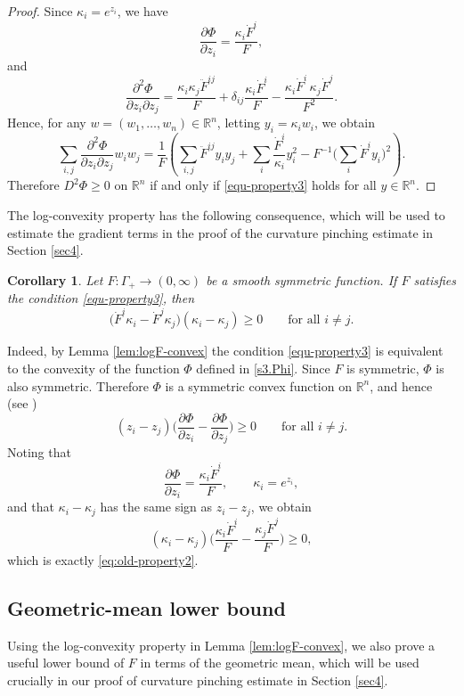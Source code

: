 \documentclass[11pt,reqno]{amsart}
\newtheorem{corollary}[proposition]{Corollary}
\theoremstyle{remark}
\numberwithin{equation}{section}
\begin{document}
\begin{proof}
Since $\kappa_i=e^{z_i}$, we have
\[\frac{\partial\Phi}{\partial z_i}
=\frac{\kappa_i\dot{F}^i}{F}, \]
and
\[\frac{\partial^2\Phi}{\partial z_i\partial z_j}
=\frac{\kappa_i\kappa_j\ddot{F}^{ij}}{F}
+\delta_{ij}\frac{\kappa_i\dot{F}^i}{F}
-\frac{\kappa_i\dot{F}^i\,\kappa_j\dot{F}^j}{F^2}.
\]
Hence, for any $w=(w_1,\dots,w_n)\in\mathbb{R}^n$, letting $y_i=\kappa_i w_i$, we obtain
\[\sum_{i,j}\frac{\partial^2\Phi}{\partial z_i\partial z_j}w_iw_j
=\frac{1}{F}\left(\sum_{i,j}\ddot{F}^{ij}y_iy_j
+\sum_i \frac{\dot{F}^i}{\kappa_i}y_i^2
-F^{-1}\Big(\sum_i \dot{F}^i y_i\Big)^2\right).
\]
Therefore $D^2\Phi\ge 0$ on $\mathbb{R}^n$ if and only if \eqref{equ-property3} holds for all $y\in\mathbb{R}^n$.
\end{proof}

The log-convexity property has the following consequence, which will be used to estimate the gradient terms in the proof of the curvature pinching estimate in Section \ref{sec4}.

\begin{corollary}\label{lem.cond-ii}
Let $F:\Gamma_+\to (0,\infty)$ be a smooth symmetric function. If $F$ satisfies the condition \eqref{equ-property3}, then 
\begin{equation}\label{eq:old-property2}
\big(\dot F^i\kappa_i-\dot F^j\kappa_j\big)(\kappa_i-\kappa_j)\ge 0
\qquad \text{for all } i\neq j.
\end{equation}
\end{corollary}
\proof 
Indeed, by Lemma \ref{lem:logF-convex} the condition \eqref{equ-property3} is equivalent to the convexity of the function $\Phi$ defined in \eqref{s3.Phi}. Since $F$ is symmetric, $\Phi$ is also symmetric. Therefore $\Phi$ is a symmetric convex function on $\mathbb{R}^n$, and hence (see \cite[Lemma 2]{EH89})
\[
(z_i-z_j)\big(\frac{\partial\Phi}{\partial z_i}-\frac{\partial\Phi}{\partial z_j}\big)\ge 0
\qquad \text{for all } i\neq j.
\]
Noting that
\[
\frac{\partial\Phi}{\partial z_i}=\frac{\kappa_i\dot F^i}{F},
\qquad \kappa_i=e^{z_i},
\]
and that $\kappa_i-\kappa_j$ has the same sign as $z_i-z_j$, we obtain
\[
(\kappa_i-\kappa_j)\Big(\frac{\kappa_i\dot F^i}{F}-\frac{\kappa_j\dot F^j}{F}\Big)\ge 0,
\]
which is exactly \eqref{eq:old-property2}.
\endproof 


\subsection{Geometric-mean lower bound}
Using the log-convexity property in Lemma \ref{lem:logF-convex}, we also  prove a useful lower bound of $F$ in terms of the geometric mean, which will be used crucially in our proof of curvature pinching estimate in Section \ref{sec4}. 
\end{document}
